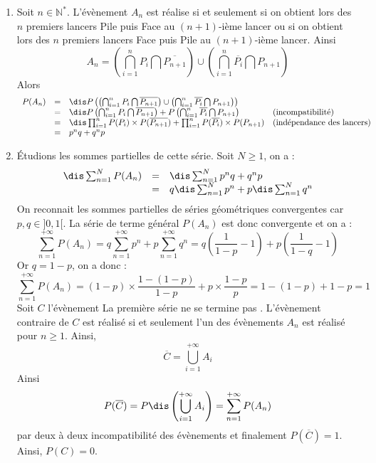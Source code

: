 \documentclass[a4paper,10pt]{report}
\begin{document}
\begin{enumerate}
\item Soit $n \in \mathbb{N}^*$. L'évènement $A_n$ est réalise si et seulement si on obtient lors des $n$ premiers lancers Pile puis Face au $(n+1)$-ième lancer ou si on  obtient lors des $n$ premiers lancers Face puis Pile au $(n+1)$-ième lancer. Ainsi 
\[ A_n = \left( \bigcap_{i=1}^n P_i \bigcap \overline{P_{n+1}} \right) \cup \left( \bigcap_{i=1}^n \overline{P_i} \bigcap P_{n+1} \right)\]
Alors 
\[ \begin{array}{llll}
P(A_n) & = & \dis P\left(\left( \bigcap_{i=1}^n P_i \bigcap \overline{P_{n+1}} \right) \cup \left( \bigcap_{i=1}^n \overline{P_i} \bigcap P_{n+1} \right)\right) & \\
& = &  \dis P\left(\bigcap_{i=1}^n P_i \bigcap \overline{P_{n+1}}\right) + P  \left(\bigcap_{i=1}^n \overline{P_i} \bigcap P_{n+1} \right) & \hbox{(incompatibilité)} \\
& = & \dis \prod_{i=1}^n P(P_i) \times P( \overline{P_{n+1}}) + \prod_{i=1}^n P(\overline{P_i}) \times P( P_{n+1}) & \hbox{(indépendance des lancers)} \\
& = & p^n q + q^n p \\
\end{array} \]
\item Étudions les sommes partielles de cette série. Soit $N \geq 1$, on a :
\[ \begin{array}{ccl}
\dis \sum_{n=1}^N P(A_n) & = & \dis \sum_{n=1}^N p^nq + q^np \\
 & = & q \dis \sum_{n=1}^N p^n + p \dis \sum_{n=1}^N q^n \\
 \end{array} \]
 On reconnait les sommes partielles de séries géométriques convergentes car $p,q \in ]0,1[$. La série de terme général $P(A_n)$ est donc convergente et on a :
 \[ \sum_{n=1}^{ + \infty} P(A_n)  = q \sum_{n=1}^{+ \infty} p^n +p \sum_{n=1}^{+ \infty} q^n = q \left( \frac{1}{1-p} - 1 \right) +  p \left( \frac{1}{1-q} - 1 \right) \]
Or $q=1-p$, on a donc :
 \[   \sum_{n=1}^{ + \infty} P(A_n) = (1-p) \times \frac{1-(1-p)}{1-p} + p \times \frac{1-p}{p} = 1-(1-p)+1-p=1 \]
Soit $C$ l'évènement \og La première série ne se termine pas \fg . L'évènement contraire de $C$ est réalisé si et seulement l'un des évènements $A_n$ est réalisé pour $n \geq 1$. Ainsi,
\[ \overline{C} = \bigcup_{i=1}^{+ \infty} A_i \]
Ainsi 
$$P(\overline{C})= P \dis \left(\bigcup_{i=1}^{+ \infty} A_i \right) = \sum_{n=1}^{+  \infty} P(A_n)$$
par deux à deux incompatibilité des évènements et finalement $P(\overline{C})=1$. Ainsi, $P(C)=0$.

\end{enumerate}
\end{document}
